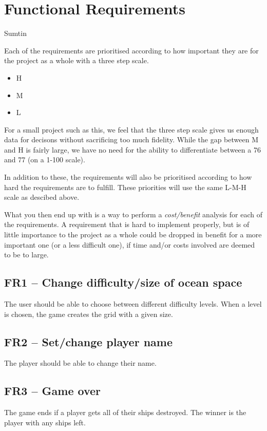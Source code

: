 \chapter{Functional Requirements}
Sumtin

Each of the requirements are prioritised according to how important they are for the project as a whole with a three step scale.

\begin{itemize}
    \item{H}
    \item{M}
    \item{L}
\end{itemize}

For a small project such as this, we feel that the three step scale gives us enough data for decisons without sacrificing too much fidelity. While the gap between M and H is fairly large, we have no need for the ability to differentiate between a 76 and 77 (on a 1-100 scale).

In addition to these, the requirements will also be prioritised according to how hard the requirements are to fulfill. These priorities will use the same L-M-H scale as descibed above.

What you then end up with is a way to perform a \emph{cost/benefit} analysis for each of the requirements. A requirement that is hard to implement properly, but is of little importance to the project as a whole could be dropped in benefit for a more important one (or a less difficult one), if time and/or costs involved are deemed to be to large.



\section*{FR1 – Change difficulty/size of ocean space}
The user should be able to choose between different difficulty levels. When a level is chosen, the game creates the grid with a given size.

\section{FR2 – Set/change player name}
The player should be able to change their name.

\section{FR3 – Game over}
The game ends if a player gets all of their ships destroyed. The winner is the player with any ships left.

